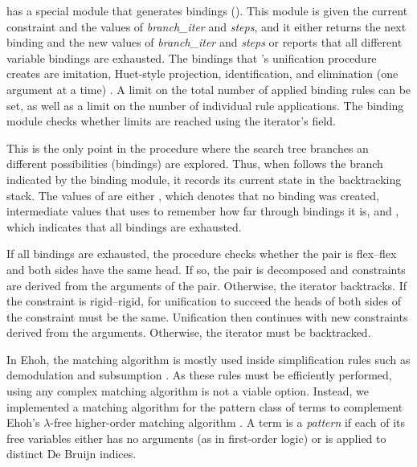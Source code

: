 \ehohii{} has a special module that generates bindings (). This
module is given the current constraint and the values of \emph{branch\_iter} and
\emph{steps}, and it either returns the next binding and the new values of
\emph{branch\_iter} and \emph{steps} or reports that all different variable
bindings are exhausted. The bindings that \ehohii{}'s unification procedure creates
are imitation, Huet-style projection, identification, and elimination (one
argument at a time) \cite[Sect.~3]{unif-section}. A limit on the
total number of applied binding rules can be set, as well as a limit on the
number of individual rule applications. The binding module checks whether limits
are reached using the iterator's  field.

This is the only point in the procedure where the search tree branches an
different possibilities (bindings) are explored.
Thus, when \ehohii{} follows the branch indicated by the
binding module, it records its current state in the backtracking stack. The
values of  are either , which denotes that no
binding was created, intermediate values that  uses
to remember how far through bindings it is, and , which indicates
that all bindings are exhausted.

If all bindings are exhausted, the procedure checks whether the pair is
flex--flex and both sides have the same head. If so, the pair is decomposed and
constraints are derived from the arguments of the pair. Otherwise, the iterator
backtracks.
%
If the constraint is rigid--rigid, for unification to succeed the heads of both
sides of the constraint must be the same. Unification then continues
with new constraints derived from the arguments. Otherwise, the iterator must be
backtracked.

 In Ehoh, the matching algorithm is mostly used inside
simplification rules such as demodulation and subsumption \cite{ss-02-brainiac}.
As these rules must be efficiently performed, using any complex matching
algorithm is not a viable option. Instead, we implemented a matching algorithm
for the pattern class of terms \cite{tn-93-patterns} to complement Ehoh's
$\lambda$-free higher-order matching algorithm \cite[Sect.~4]{section-ehoh}.
A term is a \emph{pattern} if each of its free variables either
has no arguments (as in first-order logic) or is applied to distinct De Bruijn
indices.

